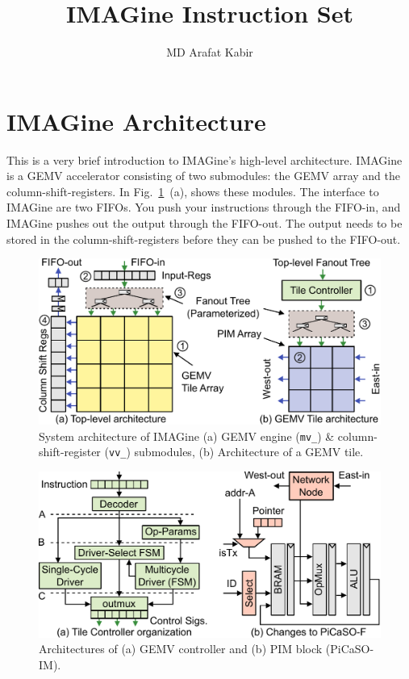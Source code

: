 \documentclass{article}
\title{IMAGine Instruction Set}
\author{MD Arafat Kabir}
\begin{document}
\maketitle


\section{IMAGine Architecture}
This is a very brief introduction to IMAGine's high-level architecture.
IMAGine is a GEMV accelerator consisting of two submodules: the GEMV array
and the column-shift-registers.
In Fig.~\ref{fig:archSysTile}~(a), shows these modules.
The interface to IMAGine are two FIFOs.
You push your instructions through the FIFO-in, and
IMAGine pushes out the output through the FIFO-out.
The output needs to be stored in the column-shift-registers before
they can be pushed to the FIFO-out.


\begin{figure}[h]
\centering
\includegraphics[width=0.7\linewidth]{fig/sys-tile-arch.pdf}
\caption{
System architecture of IMAGine
(a) GEMV engine (\texttt{mv\_}) \& column-shift-register (\texttt{vv\_}) submodules,
(b) Architecture of a GEMV tile.
}
\label{fig:archSysTile}
\end{figure}


\begin{figure}[h]
\centering
\includegraphics[width=0.7\linewidth]{fig/control-pim-arch.pdf}
\caption{
Architectures of 
(a) GEMV controller and 
(b) PIM block (PiCaSO-IM).
}
\label{fig:archControlPim}
\end{figure}
\end{document}
